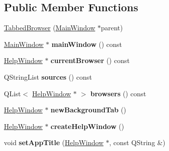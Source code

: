 \subsection*{Public Member Functions}
\begin{DoxyCompactItemize}
\item 
\hyperlink{classTabbedBrowser_a47b837c4b6309887756a472ce5ca3ad5}{TabbedBrowser} (\hyperlink{classMainWindow}{MainWindow} $\ast$parent)
\item 
\hypertarget{classTabbedBrowser_a23ee3de59eb0bf333094364dd894aa49}{
\hyperlink{classMainWindow}{MainWindow} $\ast$ {\bfseries mainWindow} () const }
\label{classTabbedBrowser_a23ee3de59eb0bf333094364dd894aa49}

\item 
\hypertarget{classTabbedBrowser_af1ebf5244d0aef6876e9809550660eec}{
\hyperlink{classHelpWindow}{HelpWindow} $\ast$ {\bfseries currentBrowser} () const }
\label{classTabbedBrowser_af1ebf5244d0aef6876e9809550660eec}

\item 
\hypertarget{classTabbedBrowser_aaca49d726a3becd2addf13668748d2c5}{
QStringList {\bfseries sources} () const }
\label{classTabbedBrowser_aaca49d726a3becd2addf13668748d2c5}

\item 
\hypertarget{classTabbedBrowser_a67a896569f5f5058999ec89accaf1225}{
QList$<$ \hyperlink{classHelpWindow}{HelpWindow} $\ast$ $>$ {\bfseries browsers} () const }
\label{classTabbedBrowser_a67a896569f5f5058999ec89accaf1225}

\item 
\hypertarget{classTabbedBrowser_a2e8ad863cae80d22a1a86911912dda05}{
\hyperlink{classHelpWindow}{HelpWindow} $\ast$ {\bfseries newBackgroundTab} ()}
\label{classTabbedBrowser_a2e8ad863cae80d22a1a86911912dda05}

\item 
\hypertarget{classTabbedBrowser_ad0d0364f6b6d438c0f40776e048e63f0}{
\hyperlink{classHelpWindow}{HelpWindow} $\ast$ {\bfseries createHelpWindow} ()}
\label{classTabbedBrowser_ad0d0364f6b6d438c0f40776e048e63f0}

\item 
\hypertarget{classTabbedBrowser_a3d3e71b2c570f148fd78220144a308fa}{
void {\bfseries setAppTitle} (\hyperlink{classHelpWindow}{HelpWindow} $\ast$, const QString \&)}
\label{classTabbedBrowser_a3d3e71b2c570f148fd78220144a308fa}

\end{DoxyCompactItemize}

